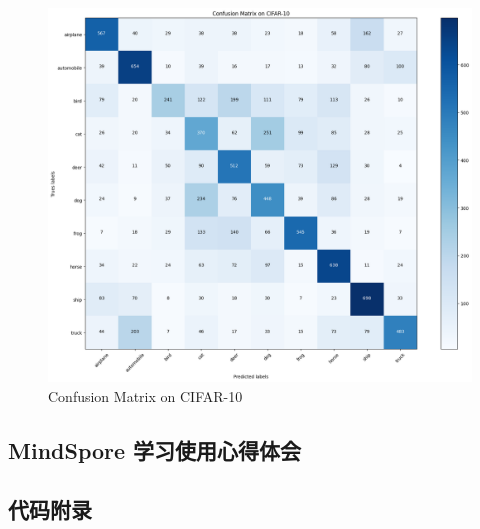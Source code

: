 \documentclass[12pt]{article}
\begin{document}
\begin{figure}[htbp]
  \centering
  \includegraphics[scale=0.5]{figures/nn/confusion_matrix.png}
  \caption{Confusion Matrix on CIFAR-10}
  \label{fig:confusion_matrix}
\end{figure}


\subsection{MindSpore 学习使用心得体会}

\subsection{代码附录}
\end{document}
